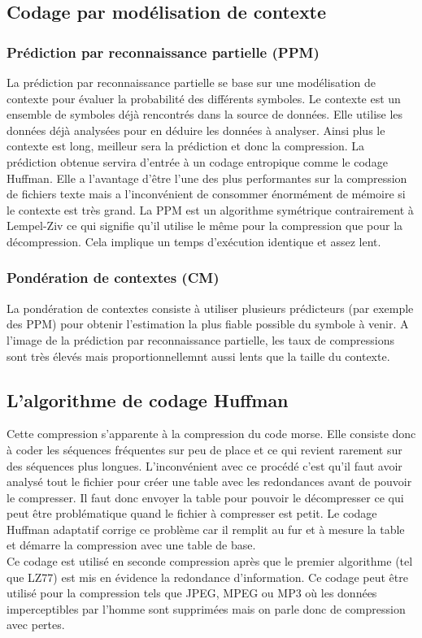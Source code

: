 \documentclass[a4paper]{report}
\begin{document}
	\subsection{Codage par modélisation de contexte}
	\subsubsection{Prédiction par reconnaissance partielle (PPM)}
		La prédiction par reconnaissance partielle se base sur une modélisation de contexte pour évaluer la probabilité des différents symboles. Le contexte est un ensemble de symboles déjà rencontrés dans la source de données. Elle utilise les données déjà analysées pour en déduire les données à analyser. Ainsi plus le contexte est long, meilleur sera la prédiction et donc la compression. La prédiction obtenue servira d'entrée à un codage entropique comme le codage Huffman. Elle a l'avantage d'être l'une des plus performantes sur la compression de fichiers texte mais a l'inconvénient de consommer énormément de mémoire si le contexte est très grand. La PPM est un algorithme symétrique contrairement à Lempel-Ziv ce qui signifie qu'il utilise le même pour la compression que pour la décompression. Cela implique un temps d'exécution identique et assez lent.
	\subsubsection{Pondération de contextes (CM)}
		La pondération de contextes consiste à utiliser plusieurs prédicteurs (par exemple des PPM) pour obtenir l'estimation la plus fiable possible du symbole à venir. A l'image de la prédiction par reconnaissance partielle, les taux de compressions sont très élevés mais proportionnellemnt aussi lents que la taille du contexte.
	\subsection{L'algorithme de codage Huffman}
		Cette compression s'apparente à la compression du code morse. Elle consiste donc à coder les séquences fréquentes sur peu de place et ce qui revient rarement sur des séquences plus longues. L'inconvénient avec ce procédé c'est qu'il faut avoir analysé tout le fichier pour créer une table avec les redondances avant de pouvoir le compresser. Il faut donc envoyer la table pour pouvoir le décompresser ce qui peut être problématique quand le fichier à compresser est petit. Le codage Huffman adaptatif corrige ce problème car il remplit au fur et à mesure la table et démarre la compression avec une table de base. \\
	Ce codage est utilisé en seconde compression après que le premier algorithme (tel que LZ77) est mis en évidence la redondance d'information. Ce codage peut être utilisé pour la compression tels que JPEG, MPEG ou MP3 où les données imperceptibles par l'homme sont supprimées mais on parle donc de compression avec pertes.
\end{document}
